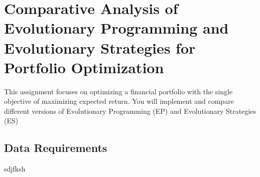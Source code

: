 \section{Comparative Analysis of Evolutionary Programming and Evolutionary Strategies for Portfolio Optimization}
This assignment focuses on optimizing a financial portfolio with the single objective of 
maximizing expected return. You will implement and compare different versions of 
Evolutionary Programming (EP) and Evolutionary Strategies (ES) 
\subsection{Data Requirements}
sdjfksh